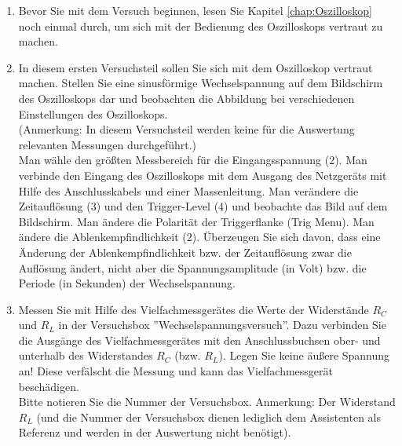 \begin{enumerate}
 \item Bevor Sie mit dem Versuch beginnen, lesen Sie Kapitel \ref{chap:Oszilloskop} noch einmal durch, um sich mit der Bedienung des Oszilloskops vertraut zu machen.
 \item In diesem ersten Versuchsteil sollen Sie sich mit dem Oszilloskop vertraut machen. Stellen Sie eine sinusförmige Wechselspannung auf dem Bildschirm des Oszilloskops dar und beobachten die Abbildung bei verschiedenen Einstellungen des Oszilloskops.\\
  (Anmerkung: In diesem Versuchsteil werden keine für die Auswertung relevanten Messungen durchgeführt.)\\
  
  \noindent
	Man wähle den größten Messbereich für die Eingangsspannung (2). Man verbinde den Eingang des Oszilloskops mit dem Ausgang des Netzgeräts mit Hilfe des Anschlusskabels und einer Massenleitung. Man
	verändere die Zeitauflösung (3) und den Trigger-Level (4) und beobachte das Bild auf dem Bildschirm. Man ändere die Polarität der Triggerflanke (Trig Menu). Man ändere die Ablenkempfindlichkeit (2). Überzeugen Sie sich davon, dass eine Änderung der Ablenkempfindlichkeit bzw. der Zeitauflösung zwar die Auflösung ändert, nicht aber die Spannungsamplitude (in Volt) bzw. die Periode (in Sekunden) der Wechselspannung.
 \item Messen Sie mit Hilfe des Vielfachmessgerätes die Werte der Widerstände $R_C$ und $R_L$ in der Versuchsbox ''Wechselspannungsversuch''. Dazu verbinden Sie die Ausgänge des Vielfachmessgerätes mit 
 	den Anschlussbuchsen ober- und unterhalb des Widerstandes $R_C$ (bzw. $R_L$). Legen Sie keine äußere Spannung an! Diese verfälscht die Messung und kann das Vielfachmessgerät beschädigen.\\
  Bitte notieren Sie die Nummer der Versuchsbox. Anmerkung: Der Widerstand $R_L$ (und die Nummer der Versuchsbox dienen lediglich dem Assistenten als Referenz und werden in der Auswertung nicht 
  benötigt).
	

\end{enumerate}
